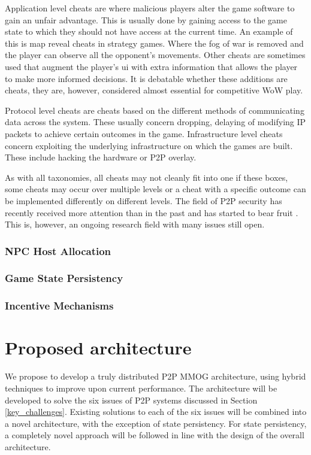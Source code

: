 \documentclass[journal,oneside,a4paper,onecolumn]{IEEEtran}
\begin{document}
Application level cheats are where malicious players alter the game software to gain an unfair advantage. This is usually done by gaining access to the game state to which they should not have access at the current time. An example of this is map reveal cheats in strategy games. Where the fog of war is removed and the player can observe all the opponent's movements. Other cheats are sometimes used that augment the player's \ac{ui} with extra information that allows the player to make more informed decisions. It is debatable whether these additions are cheats, they are, however, considered almost essential for competitive \ac{WoW} play.

Protocol level cheats are cheats based on the different methods of communicating data across the system. These usually concern dropping, delaying of modifying IP packets to achieve certain outcomes in the game. Infrastructure level cheats concern exploiting the underlying infrastructure on which the games are built. These include hacking the hardware or P2P overlay.

As with all taxonomies, all cheats may not cleanly fit into one if these boxes, some cheats may occur over multiple levels or a cheat with a specific outcome can be implemented differently on different levels. The field of P2P security has recently received more attention than in the past and has started to bear fruit \cite{survey_p2p_game_cheats}. This is, however, an ongoing research field with many issues still open.

\subsubsection{NPC Host Allocation}
\subsubsection{Game State Persistency}
\subsubsection{Incentive Mechanisms}


\section{Proposed architecture}

We propose to develop a truly distributed P2P MMOG architecture, using hybrid techniques to improve upon current performance. The architecture will be developed to solve the six issues of P2P systems discussed in Section \ref{key_challenges}. Existing solutions to each of the six issues will be combined into a novel architecture, with the exception of state persistency. For state persistency, a completely novel approach will be followed in line with the design of the overall architecture.
\end{document}
